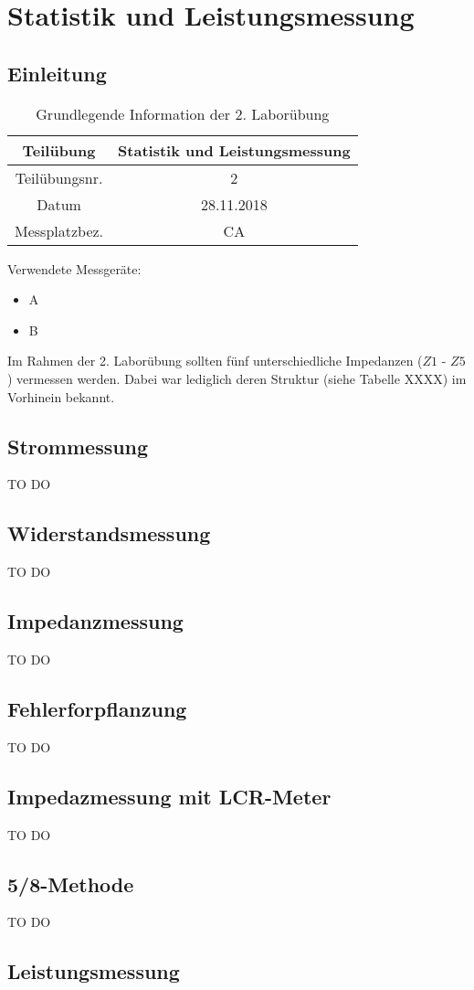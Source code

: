 \chapter{Statistik und Leistungsmessung}
\section{Einleitung}
\begin{table}[]
	\centering
	\begin{tabular}{|c|c|}
		\hline 
		Teilübung 	& Statistik und Leistungsmessung \\
		\hline 
		Teilübungsnr. 		& 2	 \\ 
		\hline 
		Datum 		& 28.11.2018 \\ 
		\hline 
		Messplatzbez. 	& CA \\
		\hline
	\end{tabular} 
	\caption{Grundlegende Information der 2. Laborübung}
\end{table}

Verwendete Messgeräte:
\begin{itemize}
	\item{A}
	\item{B}
\end{itemize}

Im Rahmen der 2. Laborübung sollten fünf unterschiedliche Impedanzen ($Z1$ - $Z5$) vermessen werden. Dabei war lediglich deren Struktur (siehe Tabelle XXXX) im Vorhinein bekannt. 

\section{Strommessung}
TO DO
\section{Widerstandsmessung}
TO DO
\section{Impedanzmessung}
TO DO
\section{Fehlerforpflanzung}
TO DO
\section{Impedazmessung mit LCR-Meter}
TO DO
\section{5/8-Methode}
TO DO
\section{Leistungsmessung}